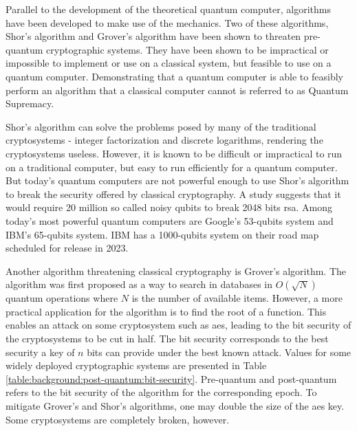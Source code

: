 Parallel to the development of the theoretical quantum computer, algorithms have been developed to make use of the mechanics. Two of these algorithms, Shor's algorithm and Grover's algorithm have been shown to threaten pre-quantum cryptographic systems. They have been shown to be impractical or impossible to implement or use on a classical system, but feasible to use on a quantum computer\cite{shor1997, jordan2021}. Demonstrating that a quantum computer is able to feasibly perform an algorithm that a classical computer cannot is referred to as Quantum Supremacy\cite{farhi2019}.

Shor's algorithm can solve the problems posed by many of the traditional cryptosystems - integer factorization and discrete logarithms, rendering the cryptosystems useless\cite{shor1997}. However, it is known to be difficult or impractical to run on a traditional computer, but easy to run efficiently for a quantum computer. But today's quantum computers are not powerful enough to use Shor's algorithm to break the security offered by classical cryptography\cite{bernstein2017}. A study \cite{gidney2019} suggests that it would require 20 million so called noisy \glspl{qubit} to break 2048 bits \gls{rsa}. Among today's most powerful quantum computers are Google's 53-\glspl{qubit} system\cite{google2019:quantum-computer} and IBM's 65-\glspl{qubit} system\cite{ibm2020:quantum-computer}. IBM has a 1000-\glspl{qubit} system on their road map scheduled for release in 2023\cite{ibm2020:quantum-computer}.

Another algorithm threatening classical cryptography is Grover's algorithm. The algorithm was first proposed as a way to search in databases in $O(\sqrt N)$ quantum operations where $N$ is the number of available items\cite{grover1996}. However, a more practical application for the algorithm is to find the root of a function\cite{bernstein2017}. This enables an attack on some cryptosystem such as \gls{aes}, leading to the bit security of the cryptosystems to be cut in half. The bit security corresponds to the best security a key of $n$ bits can provide under the best known attack. Values for some widely deployed cryptographic systems are presented in Table \ref{table:background:post-quantum:bit-security}. Pre-quantum and post-quantum refers to the bit security of the algorithm for the corresponding epoch. To mitigate Grover's and Shor's algorithms, one may double the size of the \gls{aes} key. Some cryptosystems are completely broken, however.


